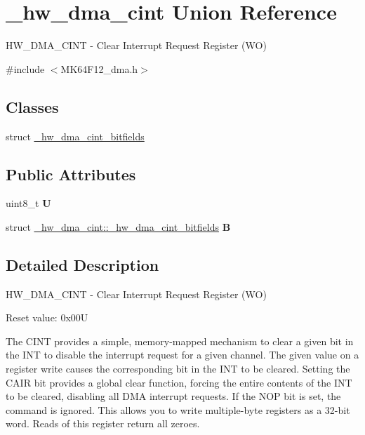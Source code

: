 \hypertarget{union__hw__dma__cint}{}\section{\+\_\+hw\+\_\+dma\+\_\+cint Union Reference}
\label{union__hw__dma__cint}


H\+W\+\_\+\+D\+M\+A\+\_\+\+C\+I\+NT -\/ Clear Interrupt Request Register (WO)  




{\ttfamily \#include $<$M\+K64\+F12\+\_\+dma.\+h$>$}

\subsection*{Classes}
\begin{DoxyCompactItemize}
\item 
struct \hyperlink{struct__hw__dma__cint_1_1__hw__dma__cint__bitfields}{\+\_\+hw\+\_\+dma\+\_\+cint\+\_\+bitfields}
\end{DoxyCompactItemize}
\subsection*{Public Attributes}
\begin{DoxyCompactItemize}
\item 
uint8\+\_\+t {\bfseries U}\hypertarget{union__hw__dma__cint_add31285ce18076a2ca786c72dea95c4c}{}\label{union__hw__dma__cint_add31285ce18076a2ca786c72dea95c4c}

\item 
struct \hyperlink{struct__hw__dma__cint_1_1__hw__dma__cint__bitfields}{\+\_\+hw\+\_\+dma\+\_\+cint\+::\+\_\+hw\+\_\+dma\+\_\+cint\+\_\+bitfields} {\bfseries B}\hypertarget{union__hw__dma__cint_aa09cb8382a9686db3cc3e2a0252f1718}{}\label{union__hw__dma__cint_aa09cb8382a9686db3cc3e2a0252f1718}

\end{DoxyCompactItemize}


\subsection{Detailed Description}
H\+W\+\_\+\+D\+M\+A\+\_\+\+C\+I\+NT -\/ Clear Interrupt Request Register (WO) 

Reset value\+: 0x00U

The C\+I\+NT provides a simple, memory-\/mapped mechanism to clear a given bit in the I\+NT to disable the interrupt request for a given channel. The given value on a register write causes the corresponding bit in the I\+NT to be cleared. Setting the C\+A\+IR bit provides a global clear function, forcing the entire contents of the I\+NT to be cleared, disabling all D\+MA interrupt requests. If the N\+OP bit is set, the command is ignored. This allows you to write multiple-\/byte registers as a 32-\/bit word. Reads of this register return all zeroes. 

